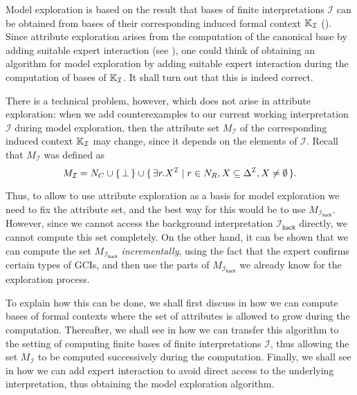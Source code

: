 Model exploration is based on the result that bases of finite interpretations
$\mathcal{I}$ can be obtained from bases of their corresponding induced formal context
${\mathbb{K}}_{\mathcal{I}}$ ().  Since attribute exploration arises
from the computation of the canonical base by adding suitable expert interaction (see
), one could think of obtaining an algorithm for model exploration by
adding suitable expert interaction during the computation of bases of ${\mathbb{K}}_{\mathcal{I}}$.  It shall turn out that this is indeed correct.

There is a technical problem, however, which does not arise in attribute exploration: when
we add counterexamples to our current working interpretation $\mathcal{I}$ during model
exploration, then the attribute set $M_{\mathcal{I}}$ of the corresponding induced context
${\mathbb{K}}_{\mathcal{I}}$ may change, since it depends on the elements of $\mathcal{I}$.
Recall that $M_{\mathcal{I}}$ was defined as
\begin{equation*}
  M_{\mathcal{I}} = N_{C} \cup {\ensuremath{\{\, \bot \,\}}} \cup {\ensuremath{\{\, \exists r. X^{\mathcal{I}} \mid r
    \in N_{R}, X \subseteq \Delta^{\mathcal{I}}, X \neq \emptyset \,\}}}.
\end{equation*}

Thus, to allow to use attribute exploration as a basis for model exploration we need to
fix the attribute set, and the best way for this would be to use
$M_{\mathcal{I}_{\mathsf{back}}}$.  However, since we cannot access the background
interpretation $\mathcal{I}_{\mathsf{back}}$ directly, we cannot compute this set
completely.  On the other hand, it can be shown that we can compute the set
$M_{\mathcal{I}_{\mathsf{back}}}$ \emph{incrementally}, using the fact that the expert
confirms certain types of GCIs, and then use the parts of
$M_{\mathcal{I}_{\mathsf{back}}}$ we already know for the exploration process.

To explain how this can be done, we shall first discuss in  how
we can compute bases of formal contexts where the set of attributes is allowed to grow
during the computation.  Thereafter, we shall see in  how we
can transfer this algorithm to the setting of computing finite bases of finite
interpretations $\mathcal{I}$, thus allowing the set $M_{\mathcal{I}}$ to be computed
successively during the computation.  Finally, we shall see in 
how we can add expert interaction to avoid direct access to the underlying interpretation,
thus obtaining the model exploration algorithm.

